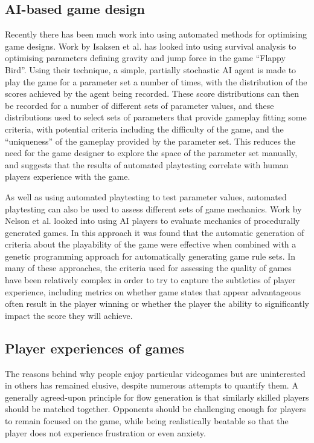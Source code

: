 \subsection{AI-based game design}

Recently there has been much work into using automated methods for optimising game designs. Work by Isaksen et al.\cite{isaksen2015exploring}\cite{isaksendiscovering} has looked into using survival analysis to optimising parameters defining gravity and jump force in the game ``Flappy Bird''. Using their technique, a simple, partially stochastic AI agent is made to play the game for a parameter set a number of times, with the distribution of the scores achieved by the agent being recorded. These score distributions can then be recorded for a number of different sets of parameter values, and these distributions used to select sets of parameters that provide gameplay fitting some criteria, with potential criteria including the difficulty of the game, and the ``uniqueness'' of the gameplay provided by the parameter set. This reduces the need for the game designer to explore the space of the parameter set manually, and suggests that the results of automated playtesting correlate with human players experience with the game.

As well as using automated playtesting to test parameter values, automated playtesting can also be used to assess different sets of game mechanics. Work by Nelson et al. looked into using AI players to evaluate mechanics of procedurally generated games\cite{nelson2015rules}. In this approach it was found that the automatic generation of criteria about the playability of the game were effective when combined with a genetic programming approach for automatically generating game rule sets. In many of these approaches, the criteria used for assessing the quality of games have been relatively complex in order to try to capture the subtleties of player experience, including metrics on whether game states that appear advantageous often result in the player winning\cite{nelson2015rules} or whether the player the ability to significantly impact the score they will achieve\cite{cook2011multi}.

\subsection{Player experiences of games}

The reasons behind why people enjoy particular videogames but are uninterested in others has remained elusive, despite numerous attempts to quantify them\cite{yannakakis2006modeling}\cite{procci2012measuring}. A generally agreed-upon principle for flow generation is that similarly skilled players should be matched together. Opponents should be challenging enough for players to remain focused on the game, while being realistically beatable so that the player does not experience frustration or even anxiety\cite{ibanez2011adaptive}.

